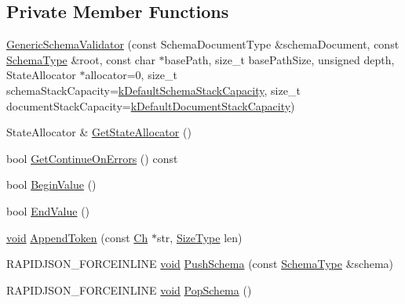 \subsection*{Private Member Functions}
\begin{DoxyCompactItemize}
\item 
\hyperlink{classGenericSchemaValidator_a639e2060d70c0788e3d9e87f0c770a7c}{Generic\+Schema\+Validator} (const Schema\+Document\+Type \&schema\+Document, const \hyperlink{classGenericSchemaValidator_ac79628f00f6720bbabb70b44f0d076a0}{Schema\+Type} \&root, const char $\ast$base\+Path, size\+\_\+t base\+Path\+Size, unsigned depth, State\+Allocator $\ast$allocator=0, size\+\_\+t schema\+Stack\+Capacity=\hyperlink{classGenericSchemaValidator_aab8510602779c91bc5b55ea81fd7385b}{k\+Default\+Schema\+Stack\+Capacity}, size\+\_\+t document\+Stack\+Capacity=\hyperlink{classGenericSchemaValidator_a0052a86778575179422064167a95c405}{k\+Default\+Document\+Stack\+Capacity})
\item 
State\+Allocator \& \hyperlink{classGenericSchemaValidator_a84115d2b389b82723a90987c08684cbb}{Get\+State\+Allocator} ()
\item 
bool \hyperlink{classGenericSchemaValidator_a9f679277e023babf6a62ef8087ffd459}{Get\+Continue\+On\+Errors} () const
\item 
bool \hyperlink{classGenericSchemaValidator_a3a701bdd690fa33db03431c8336a7653}{Begin\+Value} ()
\item 
bool \hyperlink{classGenericSchemaValidator_ae78fc24af2c112de5d7651f0755257db}{End\+Value} ()
\item 
\hyperlink{imgui__impl__opengl3__loader_8h_ac668e7cffd9e2e9cfee428b9b2f34fa7}{void} \hyperlink{classGenericSchemaValidator_acf4db1d2b158d7220adc228d872938ba}{Append\+Token} (const \hyperlink{classGenericSchemaValidator_a8b7dab5a0cda9cc0adaefb4401d260c1}{Ch} $\ast$str, \hyperlink{rapidjson_8h_a5ed6e6e67250fadbd041127e6386dcb5}{Size\+Type} len)
\item 
R\+A\+P\+I\+D\+J\+S\+O\+N\+\_\+\+F\+O\+R\+C\+E\+I\+N\+L\+I\+NE \hyperlink{imgui__impl__opengl3__loader_8h_ac668e7cffd9e2e9cfee428b9b2f34fa7}{void} \hyperlink{classGenericSchemaValidator_ae7302da6df72e7af0451a78998eb624d}{Push\+Schema} (const \hyperlink{classGenericSchemaValidator_ac79628f00f6720bbabb70b44f0d076a0}{Schema\+Type} \&schema)
\item 
R\+A\+P\+I\+D\+J\+S\+O\+N\+\_\+\+F\+O\+R\+C\+E\+I\+N\+L\+I\+NE \hyperlink{imgui__impl__opengl3__loader_8h_ac668e7cffd9e2e9cfee428b9b2f34fa7}{void} \hyperlink{classGenericSchemaValidator_a6cc7f347eace3847c428fce684c97b56}{Pop\+Schema} ()

\end{DoxyCompactItemize}
